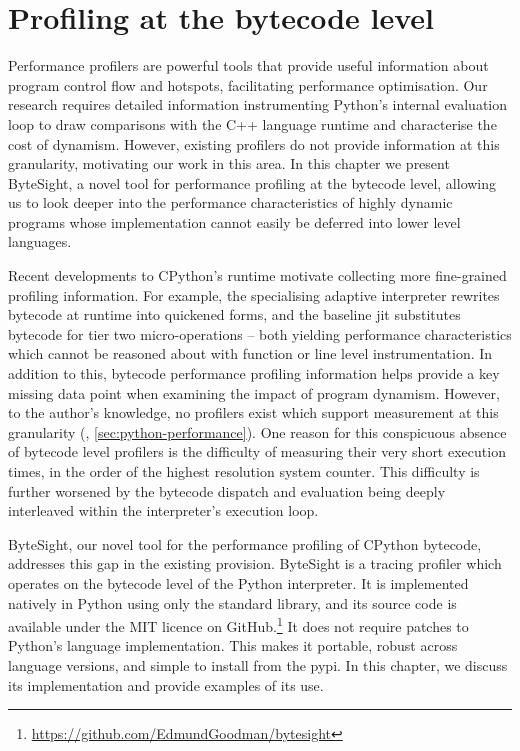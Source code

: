 \chapter{Profiling at the bytecode level} %
\label{chap:profiling-bytecode}

Performance profilers are powerful tools that provide useful information about program control flow and hotspots, facilitating performance optimisation.
Our research requires detailed information instrumenting Python's internal evaluation loop to draw comparisons with the C++ language runtime and characterise the cost of dynamism. However, existing profilers do not provide information at this granularity, motivating our work in this area. %
In this chapter we present ByteSight, a novel tool for performance profiling at the bytecode level, allowing us to look deeper into the performance characteristics of highly dynamic programs whose implementation cannot easily be deferred into lower level languages.


Recent developments to CPython's runtime motivate collecting more fine-grained profiling information.
For example, the specialising adaptive interpreter rewrites bytecode at runtime into quickened forms, and the baseline \ac{jit} substitutes bytecode for tier two micro-operations -- both yielding performance characteristics which cannot be reasoned about with function or line level instrumentation.
In addition to this, bytecode performance profiling information helps provide a key missing data point when examining the impact of program dynamism.
However, to the author's knowledge, no profilers exist which support measurement at this granularity (, \autoref{sec:python-performance}).
One reason for this conspicuous absence of bytecode level profilers is the difficulty of measuring their very short execution times, in the order of the highest resolution system counter. This difficulty is further worsened by the bytecode dispatch and evaluation being deeply interleaved within the interpreter's execution loop.

ByteSight, our novel tool for the performance profiling of CPython bytecode, addresses this gap in the existing provision.
ByteSight is a tracing profiler which operates on the bytecode level of the Python interpreter. It is implemented natively in Python using only the standard library, and its source code is available under the MIT licence on GitHub.\ifsubmission\else\footnote{\scriptsize{\url{https://github.com/EdmundGoodman/bytesight}}}\fi
It does not require patches to Python's language implementation. This makes it portable, robust across language versions, and simple to install from the \acf{pypi}.
In this chapter, we discuss its implementation and provide examples of its use.


